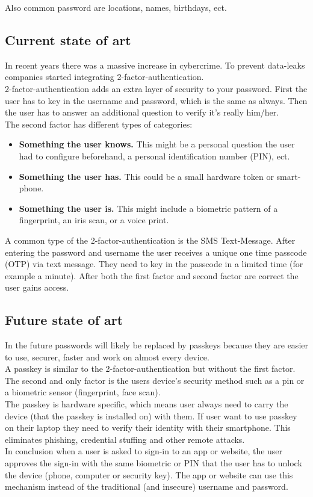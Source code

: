 \documentclass[conference]{IEEEtran}
\begin{document}
Also common password are locations, names, birthdays, ect.

\subsection{Current state of art}
In recent years there was a massive increase in cybercrime. To prevent data-leaks companies started integrating 2-factor-authentication.\\
2-factor-authentication adds an extra layer of security to your password. First the user has to key in the username and password, which is the same as always. Then the user has to answer an additional question to verify it's really him/her.\\
The second factor has different types of categories:
\begin{itemize}
\item \textbf{Something the user knows.}  This might be a personal question the user had to configure beforehand, a personal identification number (PIN), ect.
\item \textbf{Something the user has.} This could be a small hardware token or smart-phone.
\item \textbf{Something the user is.} This might include a  biometric pattern of a fingerprint, an iris scan, or a voice print. 
\end{itemize}
A common type of the 2-factor-authentication is the SMS Text-Message. After entering the password and username the user receives a unique one time passcode (OTP) via text message. They need to key in the passcode in a limited time (for example a minute). After both the first factor and second factor are correct the user gains access.
                                                                                               
\subsection{Future state of art}
In the future passwords will likely be replaced by passkeys because they are easier to use, securer, faster and work on almost every device.\\
A passkey is similar to the 2-factor-authentication but without the first factor. The second and only factor is the users device's security method such as a pin or a biometric
sensor (fingerprint, face scan). \\
The passkey is hardware specific, which means user always need to carry the device (that the passkey is installed on) with them. If user want to use passkey on their laptop they need to verify their identity with their smartphone. This eliminates phishing, credential stuffing and other remote attacks. \\
In conclusion when a user is asked to sign-in to an app or website, the user approves the sign-in with the same biometric or PIN that the user has to unlock the device 
(phone, computer or security key). The app or website can use this mechanism instead of the traditional (and insecure) username and password. 
\end{document}
